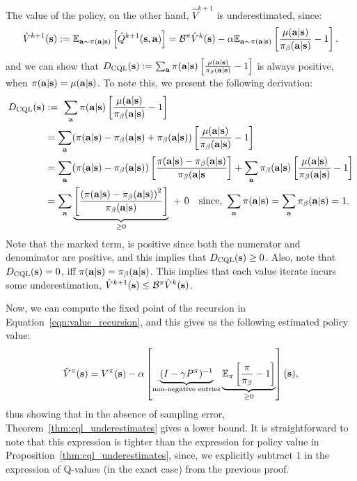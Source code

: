 The value of the policy, on the other hand, $\hat{V}^{k+1}$ is underestimated, since:
\begin{equation}
    \hat{V}^{k+1}(\mathbf{s}) := \mathbb{E}_{\mathbf{a} \sim \pi(\mathbf{a}|\mathbf{s})} \left[ \hat{Q}^{k+1}(\mathbf{s}, \mathbf{a}) \right] = \mathcal{B}^\pi \hat{V}^k (\mathbf{s}) - \alpha \mathbb{E}_{\mathbf{a} \sim \pi(\mathbf{a}|\mathbf{s})}\left[\frac{\mu(\mathbf{a}|\mathbf{s})}{{\pi_\beta}(\mathbf{a}|\mathbf{s})} - 1 \right].
    \label{eqn:value_recursion}
\end{equation}
and we can show that $D_{\text{CQL}}(\mathbf{s}): = \sum_{\mathbf{a}} \pi(\mathbf{a}|\mathbf{s}) \left[\frac{\mu(\mathbf{a}|\mathbf{s})}{{\pi_\beta}(\mathbf{a}|\mathbf{s})} - 1 \right]$ is always positive, when $\pi(\mathbf{a}|\mathbf{s}) = \mu(\mathbf{a}|\mathbf{s})$. To note this, we present the following derivation:
\begin{align*}
    D_{\text{CQL}}(\mathbf{s}) &:=~ \sum_{\mathbf{a}} \pi(\mathbf{a}|\mathbf{s}) \left[\frac{\mu(\mathbf{a}|\mathbf{s})}{{\pi_\beta}(\mathbf{a}|\mathbf{s})} - 1 \right]\\
    &= \sum_{\mathbf{a}} (\pi(\mathbf{a}|\mathbf{s}) - {\pi_\beta}(\mathbf{a}|\mathbf{s}) + {\pi_\beta}(\mathbf{a}|\mathbf{s})) \left[\frac{\mu(\mathbf{a}|\mathbf{s})}{{\pi_\beta}(\mathbf{a}|\mathbf{s})} - 1 \right]\\
    &= \sum_{\mathbf{a}} (\pi(\mathbf{a}|\mathbf{s}) - {\pi_\beta}(\mathbf{a}|\mathbf{s})) \left[ \frac{\pi(\mathbf{a}|\mathbf{s}) - {\pi_\beta}(\mathbf{a}|\mathbf{s})}{{\pi_\beta}(\mathbf{a}|\mathbf{s}} \right] + \sum_{\mathbf{a}} {\pi_\beta}(\mathbf{a}|\mathbf{s}) \left[\frac{\mu(\mathbf{a}|\mathbf{s})}{{\pi_\beta}(\mathbf{a}|\mathbf{s})} - 1 \right]\\
    &= \sum_{\mathbf{a}} \underbrace{\left[ \frac{\left(\pi(\mathbf{a}|\mathbf{s}) - {\pi_\beta}(\mathbf{a}|\mathbf{s}) \right)^2}{{\pi_\beta}(\mathbf{a}|\mathbf{s})} \right]}_{\geq 0}~ +~ 0 \text{~~~since,~} \sum_{\mathbf{a}} \pi(\mathbf{a}|\mathbf{s}) = \sum_{\mathbf{a}} {\pi_\beta}(\mathbf{a}|\mathbf{s}) = 1.
\end{align*}
Note that the marked term, is positive since both the numerator and denominator are positive, and this implies that $D_\text{CQL}(\mathbf{s}) \geq 0$. Also, note that $D_\text{CQL}(\mathbf{s}) = 0$, iff $\pi(\mathbf{a}|\mathbf{s}) = {\pi_\beta}(\mathbf{a}|\mathbf{s})$. This implies that each value iterate incurs some underestimation, $\hat{V}^{k+1}(\mathbf{s}) \leq \mathcal{B}^\pi \hat{V}^k (\mathbf{s})$.

Now, we can compute the fixed point of the recursion in Equation~\ref{eqn:value_recursion}, and this gives us the following estimated policy value:
\begin{equation*}
    \hat{V}^\pi(\mathbf{s}) = V^\pi(\mathbf{s}) - \alpha \left[ \underbrace{(I - \gamma P^\pi)^{-1}}_{\text{non-negative entries}}
    \underbrace{\mathbb{E}_{\pi}\left[\frac{\pi}{{\pi_\beta}} - 1 \right]}_{\geq 0} \right](\mathbf{s}),
\end{equation*}
thus showing that in the absence of sampling error, Theorem~\ref{thm:cql_underestimates} gives a lower bound. It is straightforward to note that this expression is tighter than the expression for policy value in Proposition~\ref{thm:cql_underestimates}, since, we explicitly subtract $1$ in the expression of Q-values (in the exact case) from the previous proof.

